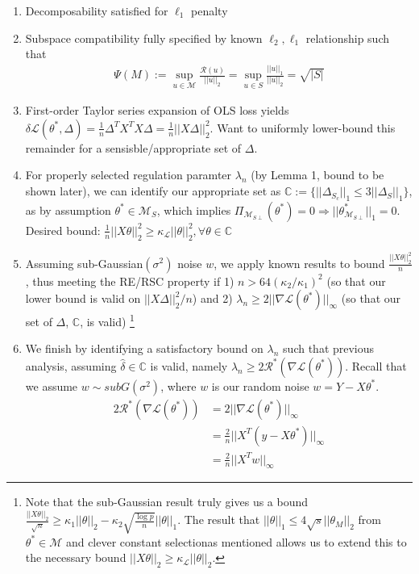 \documentclass[11pt]{article}
\begin{document}
\begin{enumerate}
    \item Decomposability satisfied for $\ell_1$ penalty 
    \item Subspace compatibility fully specified by known $\ell_2, \ell_1$ relationship such that
    \begin{gather*} \Psi(M) := \sup_{u \in \mathcal{M}} \frac{\mathcal{R}(u)}{||u||_2} = \sup_{u \in S} \frac{||u||_1}{||u||_2} = \sqrt{|S|} \end{gather*}
    \item First-order Taylor series expansion of OLS loss yields $\delta\mathcal{L}(\theta^*, \Delta) = \frac{1}{n}\Delta^T X^TX\Delta = \frac{1}{n}||X\Delta||_2^2$. Want to uniformly lower-bound this remainder for a sensisble/appropriate set of $\Delta$.  
    \item For properly selected regulation paramter $\lambda_n$ (by Lemma 1, bound to be shown later), we can identify our appropriate set as $\mathbb{C} := \{||\Delta_{S_c}||_1 \leq 3||\Delta_S||_1\}$, as by assumption $\theta^* \in \mathcal{M}_S$, which implies $\Pi_{\mathcal{M}_{S\perp}}(\theta^*) = 0 \Rightarrow ||\theta^*_{\mathcal{M}_{S\perp}}||_1=0$. 
        \subitem Desired bound: $\frac{1}{n} ||X\theta||_2^2 \geq \kappa_{\mathcal{L}} ||\theta||_2^2, \forall \theta \in \mathbb{C}$
    \item Assuming sub-Gaussian$(\sigma^2)$ noise $w$, we apply known results to bound $\frac{||X\theta||_2^2}{n}$, thus meeting the RE/RSC property if 1) $n > 64(\kappa_2 / \kappa_1)^2$ (so that our lower bound is valid on $||X\Delta||_2^2/n$) and 2) $\lambda_n \geq 2||\nabla \mathcal{L}(\theta^*)||_\infty$ (so that our set of $\Delta$, $\mathbb{C}$, is valid)
        \footnote{Note that the sub-Gaussian result truly gives us a bound $\frac{||X\theta||_2}{\sqrt{n}} \geq \kappa_1 ||\theta||_2 - \kappa_2\sqrt{\frac{\log p}{n}}||\theta||_1$. The result that $||\theta||_1 \leq 4\sqrt{s}||\theta_M||_2$ from $\theta^* \in \mathcal{M}$ and clever constant selectionas mentioned allows us to extend this to the necessary bound $||X\theta||_2 \geq \kappa_\mathcal{L} ||\theta||_2$.}

    \item We finish by identifying a satisfactory bound on $\lambda_n$ such that previous analysis, assuming $\hat\delta \in \mathbb{C}$ is valid, namely $\lambda_n \geq 2\mathcal{R}^*(\nabla\mathcal{L}(\theta^*))$. Recall that we assume $w \sim subG(\sigma^2)$, where $w$ is our random noise $w = Y-X\theta^*$. 
        \begin{align*}
            2\mathcal{R}^*(\nabla\mathcal{L}(\theta^*))
            &=
            2||\nabla \mathcal{L}(\theta^*)||_\infty
        \\
            &= 
            \frac{2}{n}|| X^T(y-X\theta^*)||_\infty
        \\
            &= 
            \frac{2}{n}|| X^Tw||_\infty
        \end{align*}
            

\end{enumerate}
\end{document}
